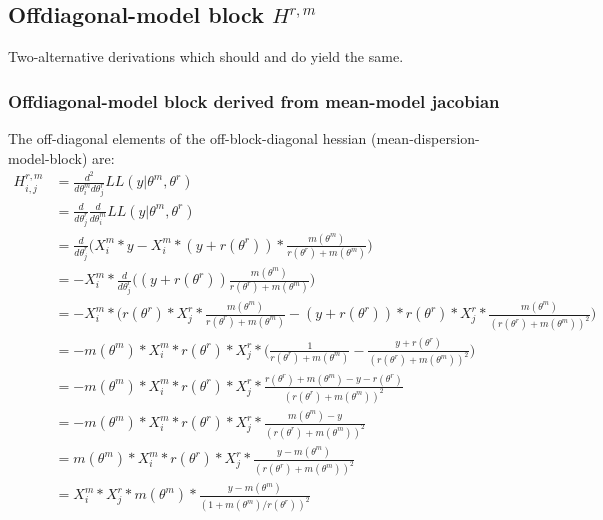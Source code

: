 \documentclass[bibliography=totoc,10pt]{scrartcl}
\begin{document}
\subsection{Offdiagonal-model block $H^{r,m}$}
Two-alternative derivations which should and do yield the same.
\subsubsection{Offdiagonal-model block derived from mean-model jacobian}
The off-diagonal elements of the off-block-diagonal hessian (mean-dispersion-model-block) are:
\begin{equation}
\begin{split}
H^{r,m}_{i,j} &= \frac{d^2}{d \theta^m_i d \theta^r_j} LL(y|\theta^m, \theta^r) \\
&= \frac{d}{d \theta^r_j} \frac{d}{d \theta^m_i} LL(y|\theta^m, \theta^r) \\
&= \frac{d}{d \theta^r_j} \bigg( X^m_{i}*y - X^m_{i}*(y+r(\theta^r))*\frac{m(\theta^m)}{r(\theta^r)+m(\theta^m)} \bigg) \\
&= -X^m_{i}* \frac{d}{d \theta^r_j} \bigg(  (y+r(\theta^r)) \frac{m(\theta^m)}{r(\theta^r)+m(\theta^m)} \bigg) \\
&= -X^m_{i}* \bigg(  r(\theta^r) * X^r_{j} * \frac{m(\theta^m)}{r(\theta^r)+m(\theta^m)} - (y+r(\theta^r)) *  r(\theta^r) * X^r_{j}  * \frac{m(\theta^m)}{(r(\theta^r)+m(\theta^m))^2} \bigg) \\
&= - m(\theta^m) * X^m_{i}   * r(\theta^r) * X^r_{j}  * \bigg( \frac{1}{r(\theta^r)+m(\theta^m)} - \frac{y+r(\theta^r)}{(r(\theta^r)+m(\theta^m))^2} \bigg) \\
&= - m(\theta^m) * X^m_{i}   * r(\theta^r) * X^r_{j}  *  \frac{r(\theta^r)+m(\theta^m)-y-r(\theta^r)}{(r(\theta^r)+m(\theta^m))^2} \\
&= - m(\theta^m) * X^m_{i}   * r(\theta^r) * X^r_{j}  *  \frac{m(\theta^m)-y}{(r(\theta^r)+m(\theta^m))^2} \\
&= m(\theta^m) * X^m_{i}   * r(\theta^r) * X^r_{j}  *  \frac{y - m(\theta^m)}{(r(\theta^r)+m(\theta^m))^2} \\
&=  X^m_{i} * X^r_{j}  * m(\theta^m) * \frac{y - m(\theta^m)}{(1+m(\theta^m)/ r(\theta^r))^2} \\
\end{split}
\end{equation}
\end{document}

